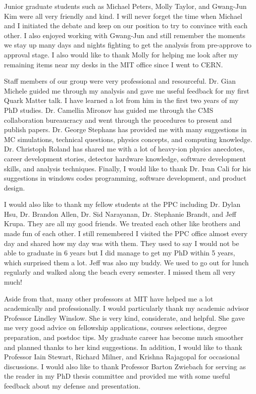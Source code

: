 Junior graduate students such as Michael Peters, Molly Taylor, and Gwang-Jun Kim were all very friendly and kind. I will never forget the time when Michael and I initiated the debate and keep on our position to try to convince with each other. I also enjoyed working with Gwang-Jun and still remember the moments we stay up many days and nights fighting to get the analysis from pre-approve to approval stage. I also would like to thank Molly for helping me look after my remaining items near my desks in the MIT office since I went to CERN. 


Staff members of our group were very professional and resourceful. Dr. Gian Michele guided me through my analysis and gave me useful feedback for my first Quark Matter talk. I have learned a lot from him in the first two years of my PhD studies. Dr. Camellia Mironov has guided me through the CMS collaboration bureaucracy and went through the procedures to present and publish papers. Dr. George Stephans has provided me with many suggestions in MC simulations, technical questions, physics concepts, and computing knowledge. Dr. Christoph Roland has shared me with a lot of heavy-ion physics anecdotes, career development stories, detector hardware knowledge, software development skills, and analysis techniques. Finally, I would like to thank Dr. Ivan Cali for his suggestions in windows codes programming, software development, and product design. 


I would also like to thank my fellow students at the PPC including Dr. Dylan Hsu, Dr. Brandon Allen, Dr. Sid Narayanan, Dr. Stephanie Brandt, and Jeff Krupa. They are all my good friends. We treated each other like brothers and made fun of each other. I still remembered I visited the PPC office almost every day and shared how my day was with them. They used to say I would not be able to graduate in 6 years but I did manage to get my PhD within 5 years, which surprised them a lot. Jeff was also my buddy. We used to go out for lunch regularly and walked along the beach every semester. I missed them all very much!

Aside from that, many other professors at MIT have helped me a lot academically and professionally. I would particularly thank my academic advisor Professor Lindley Winslow. She is very kind, considerate, and helpful. She gave me very good advice on fellowship applications, courses selections, degree preparation, and postdoc tips. My graduate career has become much smoother and planned thanks to her kind suggestions. In addition, I would like to thank Professor Iain Stewart, Richard Milner, and Krishna Rajagopal for occasional discussions. I would also like to thank Professor Barton Zwiebach for serving as the reader in my PhD thesis committee and provided me with some useful feedback about my defense and presentation.

